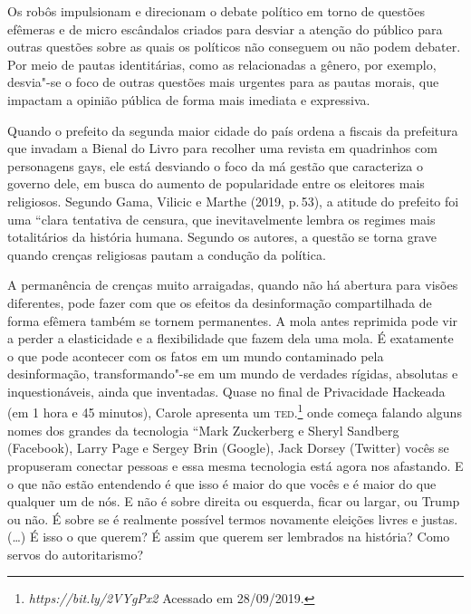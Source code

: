 Os robôs impulsionam e direcionam o debate político em torno de questões
efêmeras e de micro escândalos criados para desviar a atenção do público
para outras questões sobre as quais os políticos não conseguem ou não
podem debater. Por meio de pautas identitárias, como as relacionadas a
gênero, por exemplo, desvia"-se o foco de outras questões mais urgentes
para as pautas morais, que impactam a opinião pública de forma mais
imediata e expressiva.

Quando o prefeito da segunda maior cidade do país ordena a fiscais da
prefeitura que invadam a Bienal do Livro para recolher uma revista em
quadrinhos com personagens gays, ele está desviando o foco da má gestão
que caracteriza o governo dele, em busca do aumento de popularidade
entre os eleitores mais religiosos. Segundo Gama, Vilicic e Marthe
(2019, p.\,53), a atitude do prefeito foi uma ``clara tentativa de
censura, que inevitavelmente lembra os regimes mais totalitários da
história humana. Segundo os autores, a questão se torna grave quando
crenças religiosas pautam a condução da política.

A permanência de crenças muito arraigadas, quando não há abertura para
visões diferentes, pode fazer com que os efeitos da desinformação
compartilhada de forma efêmera também se tornem permanentes. A mola
antes reprimida pode vir a perder a elasticidade e a flexibilidade que
fazem dela uma mola. É exatamente o que pode acontecer com os fatos em
um mundo contaminado pela desinformação, transformando"-se em um mundo de
verdades rígidas, absolutas e inquestionáveis, ainda que inventadas.
Quase no final de Privacidade Hackeada (em 1 hora e 45 minutos), Carole
apresenta um \textsc{ted}.\footnote{\emph{https://bit.ly/2VYgPx2}
  Acessado em 28/09/2019.} onde começa falando alguns nomes dos grandes
da tecnologia ``Mark Zuckerberg e Sheryl Sandberg (Facebook), Larry Page
e Sergey Brin (Google), Jack Dorsey (Twitter) vocês se propuseram
conectar pessoas e essa mesma tecnologia está agora nos afastando. E o
que não estão entendendo é que isso é maior do que vocês e é maior do
que qualquer um de nós. E não é sobre direita ou esquerda, ficar ou
largar, ou Trump ou não. É sobre se é realmente possível termos
novamente eleições livres e justas. (\ldots{}) É isso o que querem? É assim
que querem ser lembrados na história? Como servos do autoritarismo?

